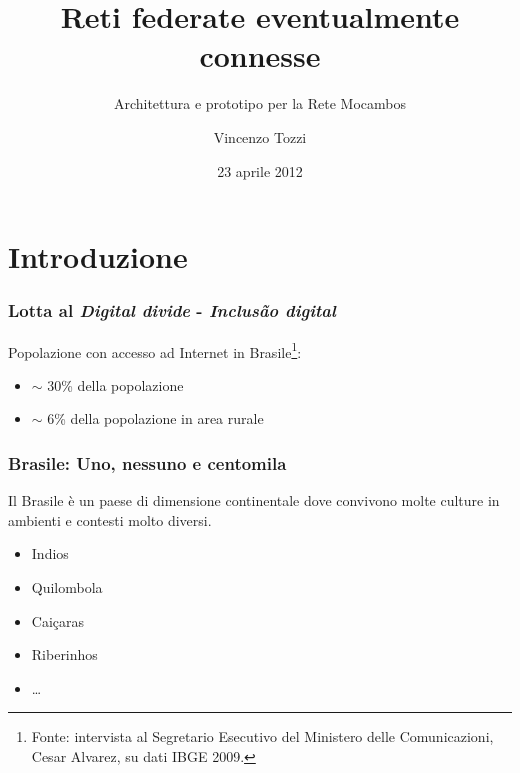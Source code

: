 \documentclass{beamer}
\title{Reti federate eventualmente connesse}
\subtitle{Architettura e prototipo per la Rete Mocambos}
\author{Vincenzo Tozzi}
\institute{Universit\`a degli Studi di Firenze - Corso di Laurea in Informatica}
\date{23 aprile 2012}
\begin{document}
{
%
\begin{frame}
  \titlepage
\end{frame}
}

\section[Sommario]{}
\begin{frame}
  \tableofcontents
\end{frame}

\section{Introduzione}

\begin{frame}

  \frametitle{Lotta al \emph{Digital divide} - \emph{Inclusão digital}}
  Popolazione con accesso ad Internet in Brasile\footnote{Fonte: intervista al Segretario Esecutivo del Ministero delle
    Comunicazioni, Cesar Alvarez, su dati IBGE 2009.}:
  \begin{itemize}
    \item $\sim$ 30\% della popolazione
    \item $\sim$ 6\% della popolazione in area rurale  
  \end{itemize}
    
\end{frame}

\begin{frame}

  \frametitle{Brasile: Uno, nessuno e centomila}
  Il Brasile è un paese di dimensione continentale dove convivono
  molte culture in ambienti e contesti molto diversi. 
  \begin{itemize}
  \item Indios
  \item Quilombola
  \item Caiçaras
  \item Riberinhos
  \item \ldots
  \end{itemize}

\end{frame}
\end{document}
